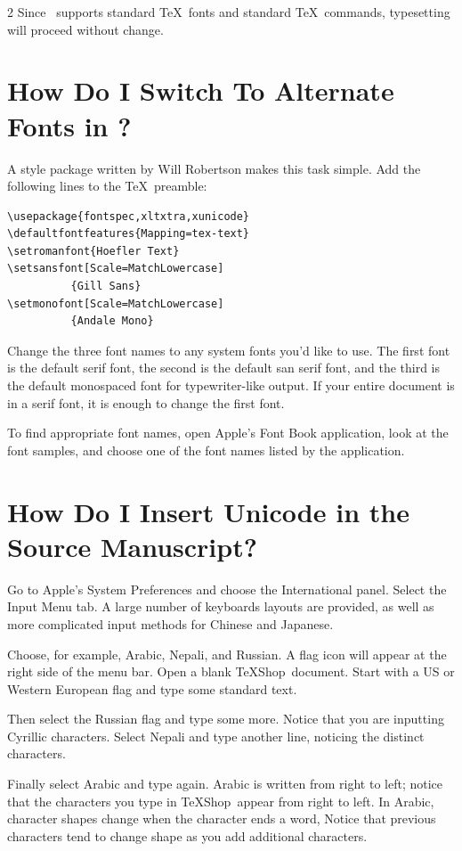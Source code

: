 \documentclass[11pt, oneside]{amsart}
\newcommand{\TS}{TeXShop}
\begin{document}
\begin{multicols}{2}
Since \XeLaTeX\ supports standard \TeX\ fonts and standard \TeX\ commands, typesetting will proceed without change.

\section{How Do I Switch To Alternate Fonts in \XeLaTeX?}

A style package written by Will Robertson makes this task simple. Add the following lines to the \TeX\ preamble:
\begin{verbatim}
\usepackage{fontspec,xltxtra,xunicode}
\defaultfontfeatures{Mapping=tex-text}
\setromanfont{Hoefler Text}
\setsansfont[Scale=MatchLowercase]
          {Gill Sans}
\setmonofont[Scale=MatchLowercase]
          {Andale Mono}
\end{verbatim}
Change the three font names to any system fonts you'd like to use. The first font is the default serif font, the second is the default san serif font, and the third is the default monospaced font for typewriter-like output. If your entire document is in a serif font, it is enough to change the first font.

To find appropriate font names, open Apple's Font Book application, look at the font samples, and choose one of the font names listed by the application.

\section{How Do I Insert Unicode in the Source Manuscript?}

Go to Apple's System Preferences and choose the International panel. Select the Input Menu tab. A large number of keyboards layouts are provided, as well as more complicated input methods for Chinese and Japanese. 

Choose, for example, Arabic, Nepali, and Russian. A flag icon will appear at the right side of the menu bar. Open a blank \TS\ document. Start with a US or Western European flag and type some standard text.

Then select the Russian flag and type some more. Notice that you are inputting Cyrillic characters. Select Nepali and type another line, noticing the distinct characters. 

Finally select Arabic and type again. Arabic is written from right to left; notice that the characters you type in \TS\ appear from right to left. In Arabic, character shapes change when the character ends a word, Notice that previous characters tend to change shape as you add additional characters.


\end{multicols}
\end{document}
